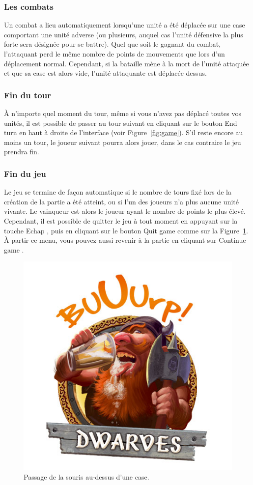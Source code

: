 \subsubsection{Les combats}

Un combat a lieu automatiquement lorsqu'une unité a été déplacée sur une case comportant une unité adverse (ou plusieurs, auquel cas l'unité défensive la plus forte sera désignée pour se battre). Quel que soit le gagnant du combat, l'attaquant perd le même nombre de points de mouvements que lors d'un déplacement normal. Cependant, si la bataille mène à la mort de l'unité attaquée et que sa case est alors vide, l'unité attaquante est déplacée dessus.

\subsubsection{Fin du tour}

À n'importe quel moment du tour, même si vous n'avez pas déplacé toutes vos unités, il est possible de passer au tour suivant en cliquant sur le bouton \og End turn \fg{} en haut à droite de l'interface (voir {\sc Figure}~\ref{fig:game}). S'il reste encore au moins un tour, le joueur suivant pourra alors jouer, dans le cas contraire le jeu prendra fin.

\subsubsection{Fin du jeu}

Le jeu se termine de façon automatique si le nombre de tours fixé lors de la création de la partie a été atteint, ou si l'un des joueurs n'a plus aucune unité vivante. Le vainqueur est alors le joueur ayant le nombre de points le plus élevé. Cependant, il est possible de quitter le jeu à tout moment en appuyant sur la touche \og Echap \fg{}, puis en cliquant sur le bouton \og Quit game \fg{} comme sur la {\sc Figure}~\ref{fig:echap}. À partir ce menu, vous pouvez aussi revenir à la partie en cliquant sur \og Continue game \fg{}.

\begin{figure}
    \centering
    \includegraphics[height=0.70\textwidth]{figure/choicePeoples.png}
    \caption{Passage de la souris au-dessus d'une case.}
    \label{fig:echap}
\end{figure}